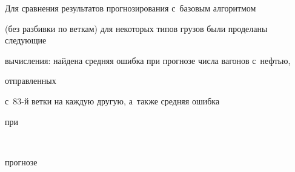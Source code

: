 Для сравнения результатов прогнозирования с~базовым алгоритмом


(без разбивки по веткам) для некоторых типов грузов были проделаны следующие


вычисления: найдена средняя ошибка при прогнозе числа вагонов с~нефтью,


от\-прав\-ленных


 с~83-й ветки на каждую другую, а~также средняя ошибка


 при\linebreak\vspace*{-12pt}





\pagebreak





\





\vspace*{-12pt}










\noindent


прогнозе


